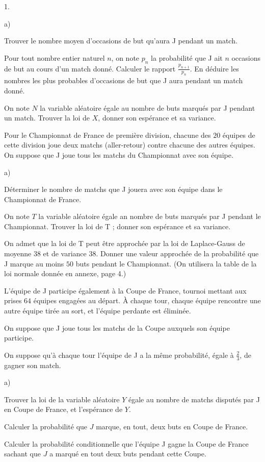 \documentclass[11pt]{article}%
\begin{document}
\begin{noliste}{1.}
 \setlength{\itemsep}{4mm}
	\item 
\begin{noliste}{a)}
 \setlength{\itemsep}{2mm}
	\item Trouver le nombre moyen d'occasions de but qu'aura J pendant un
match.
\item Pour tout nombre entier naturel $n$, on note $p_{n}$ la
probabilité que J ait $n$ occasions de but au cours
d'un match donné. 
Calculer le rapport $\frac{p_{n + 1}}{p_{n}}$.
En déduire les nombres les plus probables d'occasions de but
que J aura pendant un match donné.
\end{noliste}
\item On note $N$ la variable aléatoire égale au nombre de buts marqués
par J pendant un match. Trouver
la loi de $X$, donner son espérance et sa variance.
\item Pour le Championnat de France de première division, chacune des
$20$ équipes de cette division joue
deux matchs (aller-retour) contre chacune des autres équipes. On
suppose que J joue tous les matchs du
Championnat avec son équipe.
\begin{noliste}{a)}
 \setlength{\itemsep}{2mm}
	\item 	Déterminer le nombre de matchs que J jouera avec son équipe
dans le Championnat de France.
 \item On note $T$ la variable aléatoire égale an nombre de buts
marqués par J pendant le Championnat.
Trouver la loi de T ; donner son espérance et sa variance.
\item On admet que la loi de T peut être approchée par la loi de
Laplace-Gauss de moyenne $38$ et de
variance $38$. Donner une valeur approchée de la probabilité que J
marque au moins $50$ buts pendant le
Championnat. (On utilisera la table de la loi normale donnée en annexe,
page 4.)
\end{noliste}
\item L'équipe de J participe également à la Coupe de France, tournoi
mettant aux prises $64$ équipes engagées au départ. À chaque tour,
chaque équipe rencontre une autre équipe tirée au sort, et l'équipe
perdante
est éliminée.

	On suppose que J joue tous les matchs de la Coupe auxquels son équipe
participe.
	
	On suppose qu'à chaque tour l'équipe de J a la même probabilité, égale
à $\frac{2}{3}$, de gagner son match.
	\begin{noliste}{a)}
 \setlength{\itemsep}{2mm}
	\item Trouver la loi de la variable aléatoire $Y$ égale au nombre de
matchs disputés par J en Coupe de
France, et l'espérance de $Y$.
\item Calculer la probabilité que $J$ marque, en tout, deux buts en
Coupe de France.
\item Calculer la probabilité conditionnelle que l'équipe J gagne la
Coupe de France sachant que $J$ a marqué en tout deux buts pendant
cette Coupe.
\end{noliste}
\end{noliste}
\end{document}
